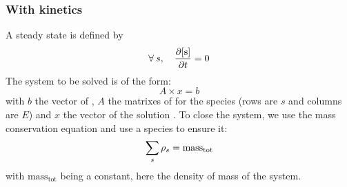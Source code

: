 \subsubsection{With kinetics}
A steady state is defined by
%
\begin{equation}
\forall\:s,\quad \doverdt{\conc[s]} = 0
\label{equilibrium:def}
\end{equation}
%
The system to be solved is of the form:
\begin{equation}
A\times x = b
\end{equation}
with $b$ the vector of \mdot, $A$ the matrixes of \doverdm[E]{\mdot[s]} for
the species (rows are $s$ and columns are $E$) and $x$ the vector of the solution \mass.
To close the system, we use the mass conservation equation and use a
species to ensure it:
\begin{equation}
\sum_s \mass[s] = \mathrm{mass_{tot}}
\label{mass_cons}
\end{equation}
with $\mathrm{mass_{tot}}$ being a constant, here the density of mass of the system.

